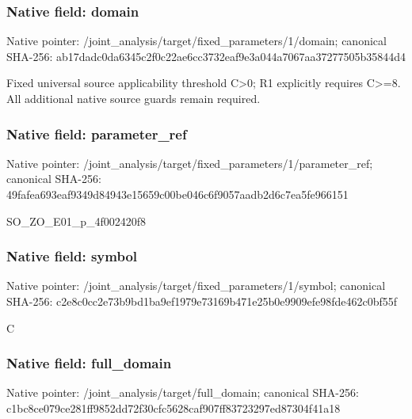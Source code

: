 \documentclass[10pt,a4paper]{article}
\begin{document}
\subsubsection{Native field: domain}
Native pointer: /joint\_\allowbreak{}analysis/target/fixed\_\allowbreak{}parameters/1/domain; canonical SHA-256: ab17dadc0da6345c2f0c22ae6cc3732eaf9e3a044a7067aa37277505b35844d4

\begingroup\raggedright\sloppy Fixed universal source applicability threshold C>0;\allowbreak{} R1 explicitly requires C>=\allowbreak{}8. All additional native source guards remain required.\par\endgroup

\subsubsection{Native field: parameter\_\allowbreak{}ref}
Native pointer: /joint\_\allowbreak{}analysis/target/fixed\_\allowbreak{}parameters/1/parameter\_\allowbreak{}ref; canonical SHA-256: 49fafea693eaf9349d84943e15659c00be046c6f9057aadb2d6c7ea5fe966151

\begingroup\raggedright\sloppy SO\_\allowbreak{}ZO\_\allowbreak{}E01\_\allowbreak{}p\_\allowbreak{}4f002420f8\par\endgroup

\subsubsection{Native field: symbol}
Native pointer: /joint\_\allowbreak{}analysis/target/fixed\_\allowbreak{}parameters/1/symbol; canonical SHA-256: c2e8c0cc2e73b9bd1ba9ef1979e73169b471e25b0e9909efe98fde462c0bf55f

\begingroup\raggedright\sloppy C\par\endgroup

\subsubsection{Native field: full\_\allowbreak{}domain}
Native pointer: /joint\_\allowbreak{}analysis/target/full\_\allowbreak{}domain; canonical SHA-256: c1bc8ce079ce281ff9852dd72f30cfc5628caf907ff83723297ed87304f41a18
\end{document}
